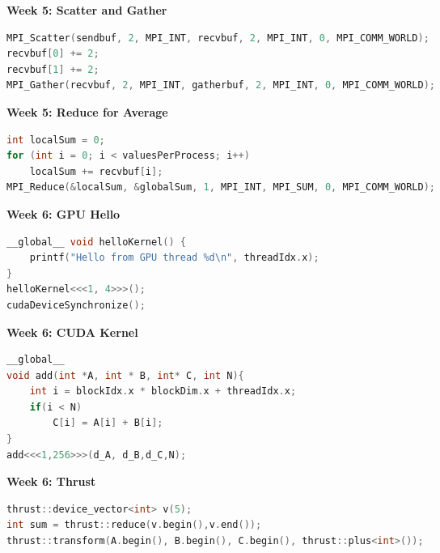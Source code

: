 \documentclass[9pt]{extarticle}
\begin{document}
\begin{multicols}{2}
\textbf{Week 5: Scatter and Gather}\par
\begin{lstlisting}[language=C++]
MPI_Scatter(sendbuf, 2, MPI_INT, recvbuf, 2, MPI_INT, 0, MPI_COMM_WORLD);
recvbuf[0] += 2;
recvbuf[1] += 2;
MPI_Gather(recvbuf, 2, MPI_INT, gatherbuf, 2, MPI_INT, 0, MPI_COMM_WORLD);
\end{lstlisting}

\textbf{Week 5: Reduce for Average}\par
\begin{lstlisting}[language=C++]
int localSum = 0;
for (int i = 0; i < valuesPerProcess; i++)
    localSum += recvbuf[i];
MPI_Reduce(&localSum, &globalSum, 1, MPI_INT, MPI_SUM, 0, MPI_COMM_WORLD);
\end{lstlisting}

\textbf{Week 6: GPU Hello}\par
\begin{lstlisting}[language=C++]
__global__ void helloKernel() {
    printf("Hello from GPU thread %d\n", threadIdx.x);
}
helloKernel<<<1, 4>>>();
cudaDeviceSynchronize();
\end{lstlisting}

\textbf{Week 6: CUDA Kernel}\par
\begin{lstlisting}[language=C++]
__global__
void add(int *A, int * B, int* C, int N){
    int i = blockIdx.x * blockDim.x + threadIdx.x;
    if(i < N)
        C[i] = A[i] + B[i];
}
add<<<1,256>>>(d_A, d_B,d_C,N);
\end{lstlisting}

\textbf{Week 6: Thrust}\par
\begin{lstlisting}[language=C++]
thrust::device_vector<int> v(5);
int sum = thrust::reduce(v.begin(),v.end());
thrust::transform(A.begin(), B.begin(), C.begin(), thrust::plus<int>());
\end{lstlisting}

\end{multicols}
\end{document}

